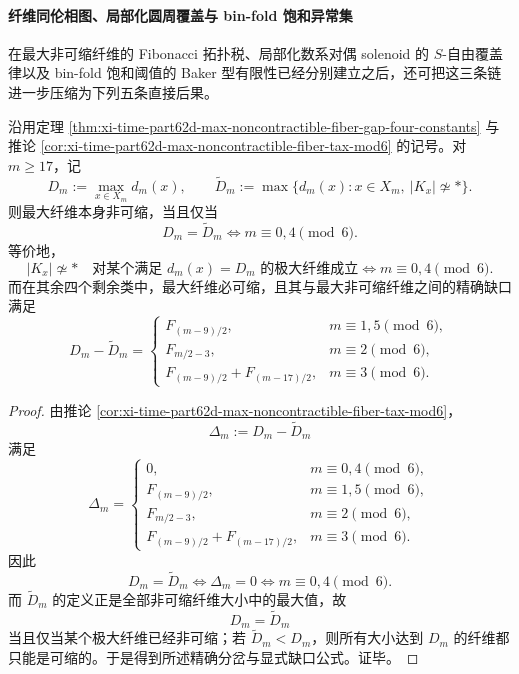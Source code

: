 \paragraph{纤维同伦相图、局部化圆周覆盖与 bin-fold 饱和异常集}
在最大非可缩纤维的 Fibonacci 拓扑税、局部化数系对偶 solenoid 的 \(S\)-自由覆盖律以及 bin-fold 饱和阈值的 Baker 型有限性已经分别建立之后，还可把这三条链进一步压缩为下列五条直接后果。

\begin{theorem}\label{thm:xi-time-part62db-maxfiber-homotopy-phase-mod6}
沿用定理 \ref{thm:xi-time-part62d-max-noncontractible-fiber-gap-four-constants} 与推论 \ref{cor:xi-time-part62d-max-noncontractible-fiber-tax-mod6} 的记号。对 \(m\ge 17\)，记
\[
D_m:=\max_{x\in X_m}d_m(x),
\qquad
\widetilde D_m:=\max\{d_m(x):x\in X_m,\ |K_x|\not\simeq *\}.
\]
则最大纤维本身非可缩，当且仅当
\[
D_m=\widetilde D_m
\iff
m\equiv 0,4\pmod 6.
\]
等价地，
\[
|K_x|\not\simeq *
\quad\text{对某个满足 }d_m(x)=D_m\text{ 的极大纤维成立}
\iff
m\equiv 0,4\pmod 6.
\]
而在其余四个剩余类中，最大纤维必可缩，且其与最大非可缩纤维之间的精确缺口满足
\[
D_m-\widetilde D_m=
\begin{cases}
F_{(m-9)/2},& m\equiv 1,5\pmod 6,\\[1mm]
F_{m/2-3},& m\equiv 2\pmod 6,\\[1mm]
F_{(m-9)/2}+F_{(m-17)/2},& m\equiv 3\pmod 6.
\end{cases}
\]
\end{theorem}
\begin{proof}
由推论 \ref{cor:xi-time-part62d-max-noncontractible-fiber-tax-mod6}，
\[
\Delta_m:=D_m-\widetilde D_m
\]
满足
\[
\Delta_m=
\begin{cases}
0,& m\equiv 0,4\pmod 6,\\[1mm]
F_{(m-9)/2},& m\equiv 1,5\pmod 6,\\[1mm]
F_{m/2-3},& m\equiv 2\pmod 6,\\[1mm]
F_{(m-9)/2}+F_{(m-17)/2},& m\equiv 3\pmod 6.
\end{cases}
\]
因此
\[
D_m=\widetilde D_m
\iff
\Delta_m=0
\iff
m\equiv 0,4\pmod 6.
\]
而 \(\widetilde D_m\) 的定义正是全部非可缩纤维大小中的最大值，故
\[
D_m=\widetilde D_m
\]
当且仅当某个极大纤维已经非可缩；若 \(\widetilde D_m<D_m\)，则所有大小达到 \(D_m\) 的纤维都只能是可缩的。于是得到所述精确分岔与显式缺口公式。证毕。
\end{proof}

